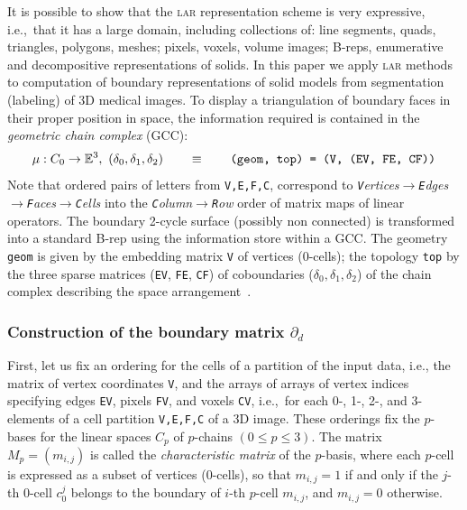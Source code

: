 It is possible to show that the \textsc{lar} representation scheme is very expressive, i.e.,~that it  has a large domain,  including collections of: line segments, quads, triangles, polygons, meshes;  pixels, voxels, volume images; B-reps, enumerative and decompositive representations of solids. 
In this paper we apply \textsc{lar} methods to computation of boundary representations of solid models from segmentation (labeling) of 3D medical images.
To display a triangulation of  boundary faces  in their proper position in space, the information required is contained in the \emph{geometric chain complex} (GCC):
\[
\mu: C_0\to\mathbb{E}^3,\ (\delta_0, \delta_1, \delta_2)
\qquad\equiv\qquad
\texttt{(geom, top) = (V, (EV, FE, CF))}
\]
Note that ordered pairs of letters from \texttt{V,E,F,C}, correspond to \emph{\emph{\texttt{V}}ertices$\to$\emph{\texttt{E}}dges$\to$\emph{\texttt{F}}aces$\to$\emph{\texttt{C}}ells} into the 
\emph{\emph{\texttt{C}}olumn$\to$\emph{\texttt{R}}ow} order of matrix maps of linear operators.
The boundary 2-cycle surface (possibly non connected) is transformed into a standard B-rep \cite{shapiroSM:202} using the information store within a GCC.
The geometry \texttt{geom} is given by
the embedding matrix \texttt{V} of vertices (0-cells); the  topology \texttt{top} by the three sparse matrices (\texttt{EV}, \texttt{FE}, \texttt{CF}) of coboundaries ($\delta_0, \delta_1, \delta_2$) of the chain complex describing the   
space arrangement~\cite{paoluzzi2019finite}.



\subsubsection*{Construction of the boundary matrix $\partial_d$}

First, let us fix an ordering for the cells of a partition of the input data, i.e., the matrix of vertex coordinates \texttt{V}, and the arrays of arrays of vertex indices specifying edges \texttt{EV}, pixels \texttt{FV}, and voxels \texttt{CV},
 i.e.,~for each 0-, 1-, 2-, and 3-elements of a cell partition \texttt{V,E,F,C} of a 3D image. These orderings fix the $p$-bases for the linear spaces $C_p$ of $p$-chains $(0\leq p\leq 3)$.  
The matrix $M_p = (m_{i,j})$ is called the \emph{characteristic matrix} of the $p$-basis, where each $p$-cell is expressed as a subset of vertices (0-cells), so that 
$m_{i,j}=1$ if and only if the $j$-th  $0$-cell $c^j_0$ belongs 
to the boundary of $i$-th $p$-cell $m_{i,j}$, and $m_{i,j}=0$ otherwise.  

